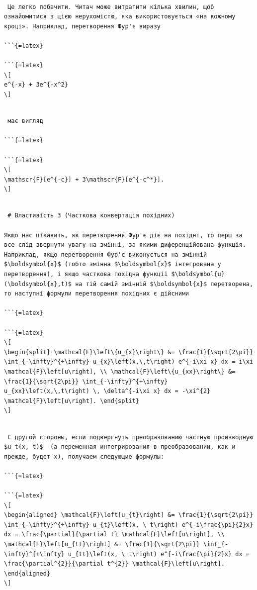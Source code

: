 \documentclass[
  ukrainian,
]{article}
\begin{document}
\begin{verbatim}

 Це легко побачити. Читач може витратити кілька хвилин, щоб ознайомитися з цією нерухомістю, яка використовується «на кожному кроці». Наприклад, перетворення Фур'є виразу

```{=latex}

```{=latex}
\[
e^{-x} + 3e^{-x^2}
\]
\end{verbatim}

\begin{verbatim}

 має вигляд

```{=latex}

```{=latex}
\[
\mathscr{F}[e^{-c}] + 3\mathscr{F}[e^{-c^*}].
\]
\end{verbatim}

\begin{verbatim}

 # Властивість 3 (Часткова конвертація похідних)

Якщо нас цікавить, як перетворення Фур'є діє на похідні, то перш за все слід звернути увагу на змінні, за якими диференційована функція. Наприклад, якщо перетворення Фур'є виконується на змінній $\boldsymbol{x}$ (тобто змінна $\boldsymbol{x}$ інтегрована у перетворення), і якщо часткова похідна функції $\boldsymbol{u}(\boldsymbol{x},t)$ на тій самій змінній $\boldsymbol{x}$ перетворена, то наступні формули перетворення похідних є дійсними

```{=latex}

```{=latex}
\[
\begin{split} \mathcal{F}\left\{u_{x}\right\} &= \frac{1}{\sqrt{2\pi}} \int_{-\infty}^{+\infty} u_{x}\left(x,\,t\right) e^{-i\xi x} dx = i\xi \mathcal{F}\left[u\right], \\ \mathcal{F}\left\{u_{xx}\right\} &= \frac{1}{\sqrt{2\pi}} \int_{-\infty}^{+\infty} u_{xx}\left(x,\,t\right) \, \delta^{-i\xi x} dx = -\xi^{2} \mathcal{F}\left[u\right]. \end{split}
\]
\end{verbatim}

\begin{verbatim}

 С другой стороны, если подвергнуть преобразованию частную производную  $u_t(x, t)$  (а переменная интегрирования в преобразовании, как и прежде, будет x), получаем следующие формулы:

```{=latex}

```{=latex}
\[
\begin{aligned} \mathcal{F}\left[u_{t}\right] &= \frac{1}{\sqrt{2\pi}} \int_{-\infty}^{+\infty} u_{t}\left(x, \ t\right) e^{-i\frac{\pi}{2}x} dx = \frac{\partial}{\partial t} \mathcal{F}\left[u\right], \\ \mathcal{F}\left[u_{tt}\right] &= \frac{1}{\sqrt{2\pi}} \int_{-\infty}^{+\infty} u_{tt}\left(x, \ t\right) e^{-i\frac{\pi}{2}x} dx = \frac{\partial^{2}}{\partial t^{2}} \mathcal{F}\left[u\right]. \end{aligned}
\]
\end{verbatim}
\end{document}
